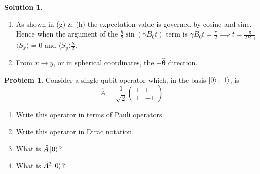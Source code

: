\documentclass[10pt]{article}
\theoremstyle{definition}
\newtheorem{problem}{Problem}
\newtheorem{soln}{Solution}
\newcommand{\uv}[1]{\hat{\bm{{#1}}}}
\begin{document}
\begin{soln}
\begin{enumerate}[label=(\alph*)]
\begin{align*}
                               & =\frac{\hbar}{4}(1-1)=0
          \end{align*}
    \item As shown in (g) \& (h) the expectation value is governed by cosine and sine. Hence when the argument of the $\frac{\hbar}{2}\sin(\gamma B_0t)$ term is
          $\gamma B_0t =\frac{\pi}{2}\implies t=\frac{\pi}{2B_0\gamma}$ $\langle S_x\rangle=0$ and $\langle S_y \rangle\frac{\hbar}{2}$.
    \item From $x\to y$, or in spherical coordinates, the $+\uv{\theta}$ direction.
  \end{enumerate}

\end{soln}

\begin{problem}
Consider a single-qubit operator which, in the basis $\ket{0},\ket{1}$, is
$$\hat{A}=\frac{1}{\sqrt{2}}\begin{pmatrix}
    1 & 1  \\
    1 & -1
  \end{pmatrix}$$
\begin{enumerate}[label=(\alph*)]
  \item Write this operator in terms of Pauli operators.
  \item Write this operator in Dirac notation.
  \item What is $\hat{A}\ket{0}$?
  \item What is $\hat{A}^2\ket{0}$?
\end{enumerate}
\end{problem}
\end{document}
